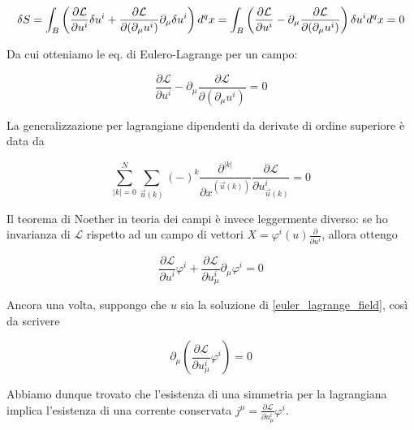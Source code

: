 \documentclass{report}
\begin{document}
\begin{equation}
    \delta S  = \int_B \left(\frac{\partial \mathcal{L}}{\partial u^i}\delta u^i + \frac{\partial \mathcal{L}}{\partial (\partial_\mu u^i)}\partial_\mu \delta u^i\right) d^qx = \int_B \left(\frac{\partial \mathcal{L}}{\partial u^i} - \partial_\mu \frac{\partial \mathcal{L}}{\partial (\partial_\mu u^i)}\right)\delta u^i d^qx = 0 
    \\[5pt]
\end{equation}

Da cui otteniamo le eq. di Eulero-Lagrange per un campo: 

\begin{tcolorbox}[colback=doc!10, colframe=black, boxrule=1pt]
\begin{equation}
    \label{euler_lagrange_field}
    \frac{\partial \mathcal{L}}{\partial u^i} - \partial_\mu \frac{\partial \mathcal{L}}{\partial (\partial_\mu u^i)} = 0 
\end{equation}
\end{tcolorbox}

La generalizzazione per lagrangiane dipendenti da derivate di ordine superiore è data da 

\begin{equation}
    \sum_{|k| = 0}^{N} \sum_{\vec{u}(k)}(-)^{k} \frac{\partial ^{|k|}}{\partial x^ {(\vec{u}(k))}}\frac{\partial \mathcal{L}}{\partial u^i_{\vec{u}(k)}} = 0
\end{equation}

Il teorema di Noether in teoria dei campi è invece leggermente diverso: se ho invarianza di $\mathcal{L}$ rispetto ad un campo di vettori $X = \varphi^i(u)\frac{\partial}{\partial u^i}$, allora ottengo 

\begin{equation}
    \frac{\partial \mathcal{L}}{\partial u^i}\varphi^i + \frac{\partial \mathcal{L}}{\partial u^i_\mu}\partial_\mu\varphi^i  = 0 
\end{equation}

Ancora una volta, suppongo che $u$ sia la soluzione di \ref{euler_lagrange_field}, così da scrivere 

\begin{equation}
    \partial_\mu \left(\frac{\partial \mathcal{L}}{\partial u^i_{\mu}}\varphi^i \right) = 0 
\end{equation}

Abbiamo dunque trovato che l'esistenza di una simmetria per la lagrangiana implica l'esistenza di una corrente conservata $j^\mu = \frac{\partial \mathcal{L}}{\partial u^i_{\mu}}\varphi^i$. 
\end{document}
